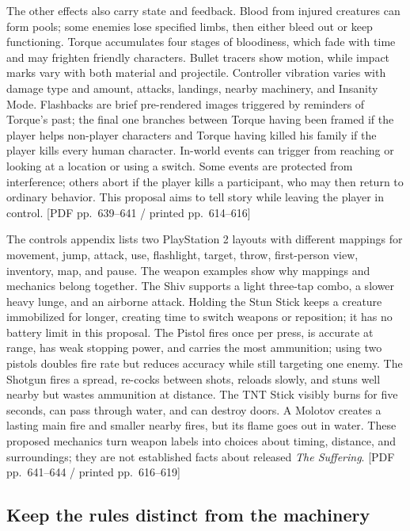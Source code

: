 The other effects also carry state and feedback. Blood from injured creatures can form pools; some enemies lose specified limbs, then either bleed out or keep functioning. Torque accumulates four stages of bloodiness, which fade with time and may frighten friendly characters. Bullet tracers show motion, while impact marks vary with both material and projectile. Controller vibration varies with damage type and amount, attacks, landings, nearby machinery, and Insanity Mode. Flashbacks are brief pre-rendered images triggered by reminders of Torque's past; the final one branches between Torque having been framed if the player helps non-player characters and Torque having killed his family if the player kills every human character. In-world events can trigger from reaching or looking at a location or using a switch. Some events are protected from interference; others abort if the player kills a participant, who may then return to ordinary behavior. This proposal aims to tell story while leaving the player in control. {[}PDF pp.~639--641 / printed pp.~614--616{]}

The controls appendix lists two PlayStation 2 layouts with different mappings for movement, jump, attack, use, flashlight, target, throw, first-person view, inventory, map, and pause. The weapon examples show why mappings and mechanics belong together. The Shiv supports a light three-tap combo, a slower heavy lunge, and an airborne attack. Holding the Stun Stick keeps a creature immobilized for longer, creating time to switch weapons or reposition; it has no battery limit in this proposal. The Pistol fires once per press, is accurate at range, has weak stopping power, and carries the most ammunition; using two pistols doubles fire rate but reduces accuracy while still targeting one enemy. The Shotgun fires a spread, re-cocks between shots, reloads slowly, and stuns well nearby but wastes ammunition at distance. The TNT Stick visibly burns for five seconds, can pass through water, and can destroy doors. A Molotov creates a lasting main fire and smaller nearby fires, but its flame goes out in water. These proposed mechanics turn weapon labels into choices about timing, distance, and surroundings; they are not established facts about released \emph{The Suffering}. {[}PDF pp.~641--644 / printed pp.~616--619{]}

\subsection{Keep the rules distinct from the machinery}\label{05-engine-i-ch009-keep-the-rules-distinct-from-the-machinery}

